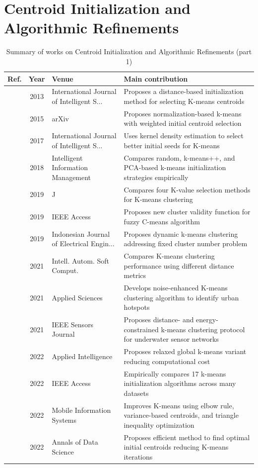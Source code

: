 \section{Centroid Initialization and Algorithmic Refinements}\label{sec:theme2}
\begin{table}[!t]
\centering
\renewcommand{\arraystretch}{1.2}
\caption{Summary of works on Centroid Initialization and Algorithmic Refinements (part 1)}\label{tab:theme2}
\begin{tabularx}{\textwidth}{@{}l c p{3.6cm} X@{}}
\toprule
\textbf{Ref.} & \textbf{Year} & \textbf{Venue} & \textbf{Main contribution} \\
\midrule
\cite{aldahdooh2013dimk} & 2013 & International Journal of Intelligent S... & Proposes a distance-based initialization method for selecting K-means centroids \\
\cite{virmani2015normalization} & 2015 & arXiv & Proposes normalization-based k-means with weighted initial centroid selection \\
\cite{kumar2017density} & 2017 & International Journal of Intelligent S... & Uses kernel density estimation to select better initial seeds for K-means \\
\cite{li2018experiment} & 2018 & Intelligent Information Management & Compares random, k-means++, and PCA-based k-means initialization strategies empirically \\
\cite{yuan2019research} & 2019 & J & Compares four K-value selection methods for K-means clustering \\
\cite{zhu2019novel} & 2019 & IEEE Access & Proposes new cluster validity function for fuzzy C-means algorithm \\
\cite{hossain2019dynamic} & 2019 & Indonesian Journal of Electrical Engin... & Proposes dynamic k-means clustering addressing fixed cluster number problem \\
\cite{ghazal2021performances} & 2021 & Intell. Autom. Soft Comput. & Compares K-means clustering performance using different distance metrics \\
\cite{ran2021novel} & 2021 & Applied Sciences & Develops noise-enhanced K-means clustering algorithm to identify urban hotspots \\
\cite{omeke2021dekcs} & 2021 & IEEE Sensors Journal & Proposes distance- and energy-constrained k-means clustering protocol for underwater sensor networks \\
\cite{vardakas2022global} & 2022 & Applied Intelligence & Proposes relaxed global k-means variant reducing computational cost \\
\cite{harris2022extensive} & 2022 & IEEE Access & Empirically compares 17 k-means initialization algorithms across many datasets \\
\cite{zhao2022design} & 2022 & Mobile Information Systems & Improves K-means using elbow rule, variance-based centroids, and triangle inequality optimization \\
\cite{zubair2022improved} & 2022 & Annals of Data Science & Proposes efficient method to find optimal initial centroids reducing K-means iterations \\
\bottomrule
\end{tabularx}
\end{table}

